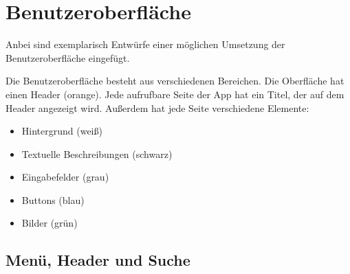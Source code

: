 \section{Benutzeroberfläche}
Anbei sind exemplarisch Entwürfe einer möglichen Umsetzung der Benutzeroberfläche eingefügt. 

Die Benutzeroberfläche besteht aus verschiedenen Bereichen. 
Die Oberfläche hat einen Header (orange). 
Jede aufrufbare Seite der App hat ein Titel, der auf dem Header angezeigt wird.
Außerdem hat jede Seite verschiedene Elemente:
\begin{itemize}[nosep]
	\item Hintergrund (weiß)
	\item Textuelle Beschreibungen (schwarz)
	\item Eingabefelder (grau)
	\item Buttons (blau)
	\item Bilder (grün)
\end{itemize}

\subsection{Menü, Header und Suche}

